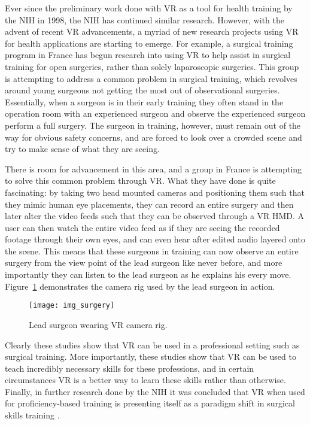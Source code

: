 Ever since the preliminary work done with VR as a tool for health training by the NIH in 1998, the NIH has continued similar research. However, with the advent of recent VR advancements, a myriad of new research projects using VR for health applications are starting to emerge. For example, a surgical training program in France has begun research into using VR to help assist in surgical training for open surgeries, rather than solely laparoscopic surgeries. This group is attempting to address a common problem in surgical training, which revolves around young surgeons not getting the most out of observational surgeries. Essentially, when a surgeon is in their early training they often stand in the operation room with an experienced surgeon and observe the experienced surgeon perform a full surgery. The surgeon in training, however, must remain out of the way for obvious safety concerns, and are forced to look over a crowded scene and try to make sense of what they are seeing.

There is room for advancement in this area, and a group in France is attempting to solve this common problem through VR. What they have done is quite fascinating: by taking two head mounted cameras and positioning them such that they mimic human eye placements, they can record an entire surgery and then later alter the video feeds such that they can be observed through a VR HMD. A user can then watch the entire video feed as if they are seeing the recorded footage through their own eyes, and can even hear after edited audio layered onto the scene. This means that these surgeons in training can now observe an entire surgery from the view point of the lead surgeon like never before, and more importantly they can listen to the lead surgeon as he explains his every move. Figure~\ref{figure:f_surgery} demonstrates the camera rig used by the lead surgeon in action.

\begin{figure}
  \centering
  \texttt{[image: img\_surgery]}
  \caption{Lead surgeon wearing VR camera rig.}
  \label{figure:f_surgery}
\end{figure}

Clearly these studies show that VR can be used in a professional setting such as surgical training. More importantly, these studies show that VR can be used to teach incredibly necessary skills for these professions, and in certain circumstances VR is a better way to learn these skills rather than otherwise. Finally, in further research done by the NIH it was concluded that VR when used for proficiency-based training is presenting itself as a paradigm shift in surgical skills training \cite{seymour_virtual_2002}.

